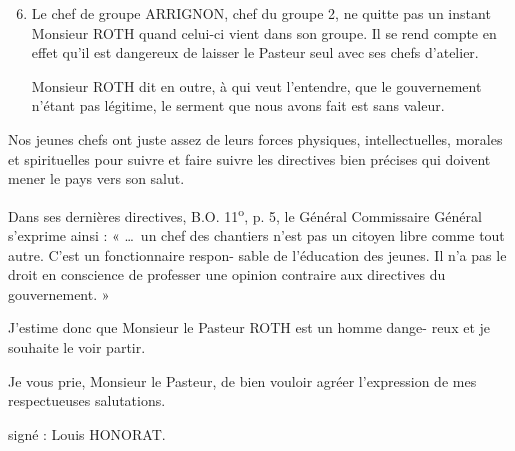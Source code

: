 
\begin{enumerate}
\setcounter{enumi}{5}

\item
Le chef de groupe ARRIGNON, chef du groupe 2, ne quitte
pas un instant Monsieur ROTH quand celui-ci vient dans son groupe.
Il se rend compte en effet qu’il est dangereux de laisser le Pasteur seul
avec ses chefs d’atelier.

Monsieur ROTH dit en outre, à qui veut l’entendre, que le
gouvernement n’étant pas légitime, le serment que nous avons fait est
sans valeur.

\end{enumerate}

Nos jeunes chefs ont juste assez de leurs forces physiques,
intellectuelles, morales et spirituelles pour suivre et faire suivre
les directives bien précises qui doivent mener le pays vers son salut.

Dans ses dernières directives, B.O. 11\textsuperscript{o}, p. 5, le Général
Commissaire Général s’exprime ainsi : « \ldots\ un chef des chantiers n’est
pas un citoyen libre comme tout autre. C’est un fonctionnaire respon-
sable de l’éducation des jeunes. Il n’a pas le droit en conscience de
professer une opinion contraire aux directives du gouvernement. »

J’estime donc que Monsieur le Pasteur ROTH est un homme dange-
reux et je souhaite le voir partir.

Je vous prie, Monsieur le Pasteur, de bien vouloir agréer
l’expression de mes respectueuses salutations.

\begin{flushright}
signé : Louis HONORAT.
\end{flushright}

